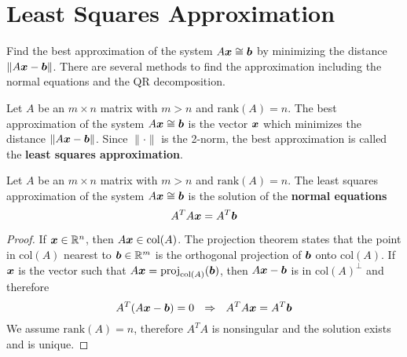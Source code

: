 \section{Least Squares Approximation}

\begin{bigidea}
Find the best approximation of the system $A \boldsymbol{x} \cong \boldsymbol{b}$ by minimizing the distance $\| A \boldsymbol{x} - \boldsymbol{b}\|$. There are several methods to find the approximation including the normal equations and the QR decomposition.
\end{bigidea}

\begin{definition}
Let $A$ be an $m \times n$ matrix with $m > n$ and $\mathrm{rank}(A) = n$. The best approximation of the system $A \boldsymbol{x} \cong \boldsymbol{b}$ is the vector $\boldsymbol{x}$ which minimizes the distance $\| A\boldsymbol{x} - \boldsymbol{b} \|$. Since $\| \cdot \|$ is the 2-norm, the best approximation is called the {\bf least squares approximation}.
\end{definition}

\begin{proposition}
Let $A$ be an $m \times n$ matrix with $m > n$ and $\mathrm{rank}(A) = n$. The least squares approximation of the system $A \boldsymbol{x} \cong \boldsymbol{b}$ is the solution of the {\bf normal equations} \cite[p.311]{KN}
$$
A^TA\boldsymbol{x} = A^T\boldsymbol{b}
$$
\begin{proof}
If $\boldsymbol{x} \in \mathbb{R}^n$, then $A \boldsymbol{x} \in \mathrm{col}(A)$. The projection theorem \cite[p.420]{KN} states that the point in $\mathrm{col}(A)$ nearest to $\boldsymbol{b} \in \mathbb{R}^m$ is the orthogonal projection of $\boldsymbol{b}$ onto $\mathrm{col}(A)$. If $\boldsymbol{x}$ is the vector such that $A\boldsymbol{x} = \mathrm{proj}_{\mathrm{col}(A)}(\boldsymbol{b})$, then $A\boldsymbol{x} - \boldsymbol{b}$ is in $\mathrm{col}(A)^{\perp}$ and therefore
$$
A^T(A\bs{x} - \bs{b}) = 0 \ \ \Rightarrow \ \ A^TA\bs{x} = A^T\bs{b}
$$
We assume $\mathrm{rank}(A) = n$, therefore $A^TA$ is nonsingular and the solution exists and is unique.
\end{proof}
\end{proposition}

